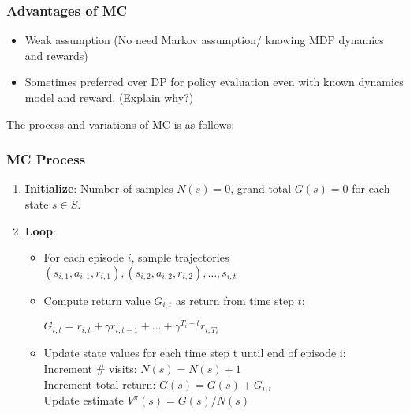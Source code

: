 \documentclass{article}
\begin{document}
\begin{hintbox}
    \subsubsection*{Advantages of MC}
    \begin{itemize}
    \item Weak assumption (No need Markov assumption/ knowing MDP dynamics and rewards)
    \item Sometimes preferred over DP for policy evaluation even with known dynamics model and reward. (Explain why?)
    \end{itemize}
\end{hintbox}

The process and variations of MC is as follows:
\begin{thmbox}
    \subsubsection*{MC Process}
    \begin{enumerate}
    \item \textbf{Initialize}:
        Number of samples $N(s) = 0$, grand total $G(s) = 0$ for each state $s \in S$.
    \item \textbf{Loop}:
        \begin{itemize}
        \item For each episode $i$, sample trajectories $(s_{i,1}, a_{i,1}, r_{i,1}), (s_{i,2}, a_{i,2}, r_{i,2}), \dots , s_{i, t_i}$
        \item Compute return value $G_{i, t}$ as return from time step $t$:
            \begin{center}
                $G_{i, t} = r_{i, t} + \gamma r_{i, t+1} + \dots + \gamma^{T_i-t} r_{i,T_i}$
            \end{center}
        \item Update state values for each time step t until end of episode i:
            \\Increment \# visits: $N(s) = N(s) + 1$
            \\Increment total return: $G(s) = G(s) + G_{i, t}$
            \\Update estimate $V^{\pi}(s) = G(s)/ N(s)$
        \end{itemize}
    \end{enumerate}  
\end{thmbox}
\end{document}
